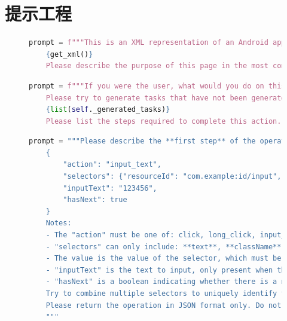 \documentclass[twocolumn, 10pt]{article}
\begin{document}
\newpage

\appendix

\section{提示工程}
\label{sec:prompt}

\begin{figure}[h]
\centering
\begin{lstlisting}[language=Python,caption=意图理解]
    prompt = f"""This is an XML representation of an Android application page:
    {get_xml()}
    Please describe the purpose of this page in the most concise language possible."""
\end{lstlisting}
\label{fig:intent}
\end{figure}

\begin{figure}[h]
\centering
\begin{lstlisting}[language=python, caption=操作描述]
    prompt = f"""If you were the user, what would you do on this page? You can only describe one action. 
    Please try to generate tasks that have not been generated before. Below are the tasks that have already been generated:
    {list(self._generated_tasks)}
    Please list the steps required to complete this action. (This action will be named 'The Task')"""
\end{lstlisting}
\label{fig:action}
\end{figure}

\begin{figure}[h]
\centering
\begin{lstlisting}[language=python, caption=初始事件生成]
    prompt = """Please describe the **first step** of the operation you just performed in JSON format, as shown below:
    {
        "action": "input_text",
        "selectors": {"resourceId": "com.example:id/input", "text": "password"},
        "inputText": "123456",
        "hasNext": true
    }
    Notes:
    - The "action" must be one of: click, long_click, input_text, press_enter
    - "selectors" can only include: **text**, **className**, **description**, **resourceId**, and must be in camelCase. You can not use other selectors.
    - The value is the value of the selector, which must be found in the previous XML
    - "inputText" is the text to input, only present when the action is input_text
    - "hasNext" is a boolean indicating whether there is a next step. Set it to false if there is no next step
    Try to combine multiple selectors to uniquely identify the element.
    Please return the operation in JSON format only. Do not explain or use code blocks.
    """
\end{lstlisting}
\label{fig:iterative}
\end{figure}
\end{document}
